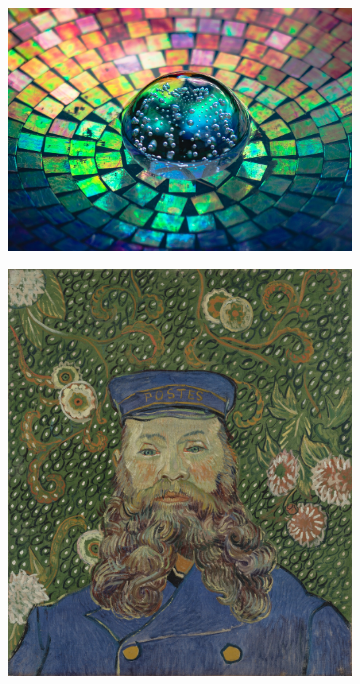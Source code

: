 \begin{figure}[H]
    \centering

    \begin{subfigure}[h]{0.32\textwidth}
        \centering
        \quad
    \end{subfigure}
    \begin{subfigure}[h]{0.32\textwidth}
        \centering
        \includegraphics[width=\textwidth]{resources/content/style/crystal_glass_on_a_colorful_background.jpg}
    \end{subfigure}
    \begin{subfigure}[h]{0.32\textwidth}
        \centering
        \includegraphics[width=\textwidth]{resources/content/style/portrait_of_joseph_roulin.jpg}
    \end{subfigure}



\end{figure}
